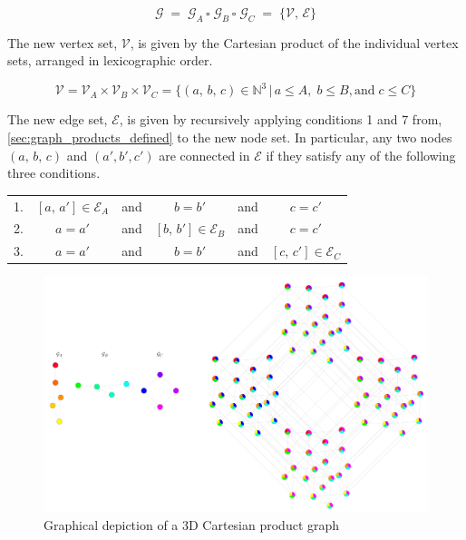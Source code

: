 \begin{equation}
    \mathcal{G} \; = \; \mathcal{G}_A \, \square \; \mathcal{G}_B \, \square \; \mathcal{G}_C \; = \; \{\mathcal{V}, \, \mathcal{E}\}
\end{equation}

The new vertex set, $\mathcal{V}$, is given by the Cartesian product of the individual vertex sets, arranged in lexicographic order. 

\begin{equation}
    \mathcal{V} = \mathcal{V}_A \times \mathcal{V}_B \times \mathcal{V}_C = \{(a, \, b, \, c) \in \mathbb{N}^3 \, | \, a \leq A, \; b \leq B, \text{and} \;  c \leq C\}
\end{equation}

The new edge set, $\mathcal{E}$, is given by recursively applying conditions 1 and 7 from, \cref{sec:graph_products_defined} to the new node set. In particular, any two nodes $(a, \, b, \, c)$ and $(a', b', c')$ are connected in $\mathcal{E}$ if they satisfy any of the following three conditions. 

\vspace{0.5cm}

\begin{table}[h]
    \def\arraystretch{1.5}
    \centering
    \begin{tabular}{lclclc}
        1. & $[a, \, a'] \in \mathcal{E}_A$    & and & $b = b'$  & and & $c = c'$             \\
        2. & $a = a'$    & and & $[b, \, b'] \in \mathcal{E}_B$   & and & $c = c'$             \\
        3. & $a = a'$    & and & $b = b'$  & and & $[c, \, c'] \in \mathcal{E}_C$              \\
    \end{tabular}
\end{table}


\begin{figure}[t]
    \begin{center}
        \includegraphics[width=\linewidth]{Figures/3D_CPG.pdf}
    \end{center}
    \caption[Graphical depiction of a 3D Cartesian product graph]{Graphical depiction of a 3D Cartesian product graph}
    \label{fig:3D_CPG}
\end{figure}

